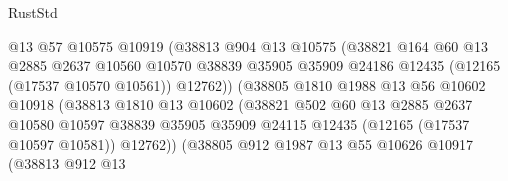 \begin{lexlean}{RustStd}
\begin{coremodule}
                                  @13
                                  @57
                                  @10575
                                  @10919
                                  (@38813
                                    @904
                                    @13
                                    @10575
                                    (@38821
                                      @164
                                      @60
                                      @13
                                      @2885
                                      @2637
                                      @10560
                                      @10570
                                      @38839
                                      @35905
                                      @35909
                                      @24186
                                      @12435
                                      (@12165 (@17537 @10570 @10561))
                                      @12762))
                                  (@38805
                                    @1810
                                    @1988
                                    @13
                                    @56
                                    @10602
                                    @10918
                                    (@38813
                                      @1810
                                      @13
                                      @10602
                                      (@38821
                                        @502
                                        @60
                                        @13
                                        @2885
                                        @2637
                                        @10580
                                        @10597
                                        @38839
                                        @35905
                                        @35909
                                        @24115
                                        @12435
                                        (@12165 (@17537 @10597 @10581))
                                        @12762))
                                    (@38805
                                      @912
                                      @1987
                                      @13
                                      @55
                                      @10626
                                      @10917
                                      (@38813
                                        @912
                                        @13

\end{coremodule}
\end{lexlean}
